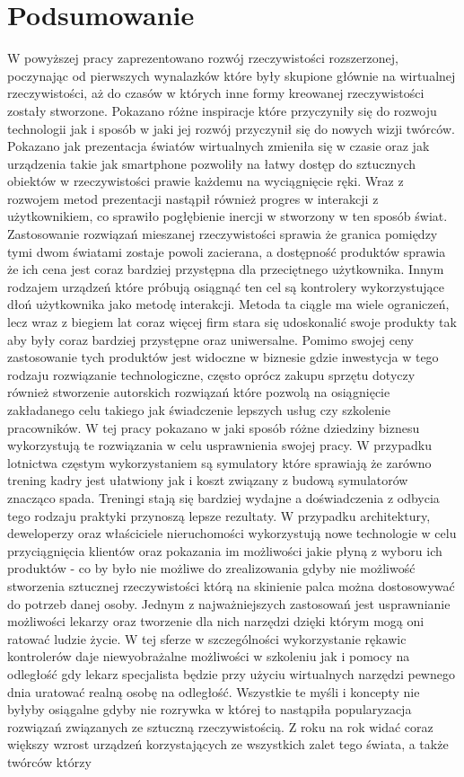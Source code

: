 \chapter*{Podsumowanie}
\label{ch:podsumowanie}
W powyższej pracy zaprezentowano rozwój rzeczywistości rozszerzonej, poczynając od pierwszych wynalazków które były skupione głównie na wirtualnej rzeczywistości, aż do czasów w których inne formy kreowanej rzeczywistości zostały stworzone. Pokazano różne inspiracje które przyczyniły się do rozwoju technologii jak i sposób w jaki jej rozwój przyczynił się do nowych wizji twórców. Pokazano jak prezentacja światów wirtualnych zmieniła się w czasie oraz jak urządzenia takie jak smartphone pozwoliły na łatwy dostęp do sztucznych obiektów w rzeczywistości prawie każdemu na wyciągnięcie ręki. Wraz z rozwojem metod prezentacji nastąpił również progres w interakcji z użytkownikiem, co sprawiło pogłębienie inercji w stworzony w ten sposób świat. Zastosowanie rozwiązań mieszanej rzeczywistości sprawia że granica pomiędzy tymi dwom światami zostaje powoli zacierana, a dostępność produktów sprawia że ich cena jest coraz bardziej przystępna dla przeciętnego użytkownika. Innym rodzajem urządzeń które próbują osiągnąć ten cel są kontrolery wykorzystujące dłoń użytkownika jako metodę interakcji. Metoda ta ciągle ma wiele ograniczeń, lecz wraz z biegiem lat coraz więcej firm stara się udoskonalić swoje produkty tak aby były coraz bardziej przystępne oraz uniwersalne. Pomimo swojej ceny zastosowanie tych produktów jest widoczne w biznesie gdzie inwestycja w tego rodzaju rozwiązanie technologiczne, często oprócz zakupu sprzętu dotyczy również stworzenie autorskich rozwiązań które pozwolą na osiągnięcie zakładanego celu takiego jak świadczenie lepszych usług czy szkolenie pracowników. W tej pracy pokazano w jaki sposób różne dziedziny biznesu wykorzystują te rozwiązania w celu usprawnienia swojej pracy. W przypadku lotnictwa częstym wykorzystaniem są symulatory które sprawiają że zarówno trening kadry jest ułatwiony jak i koszt związany z budową symulatorów znacząco spada. Treningi stają się bardziej wydajne a doświadczenia z odbycia tego rodzaju praktyki przynoszą lepsze rezultaty. W przypadku architektury, deweloperzy oraz właściciele nieruchomości wykorzystują nowe technologie w celu przyciągnięcia klientów oraz pokazania im możliwości jakie płyną z wyboru ich produktów - co by było nie możliwe do zrealizowania gdyby nie możliwość stworzenia sztucznej rzeczywistości którą na skinienie palca można dostosowywać do potrzeb danej osoby. Jednym z najważniejszych zastosowań jest usprawnianie możliwości lekarzy oraz tworzenie dla nich narzędzi dzięki którym mogą oni ratować ludzie życie. W tej sferze w szczególności wykorzystanie rękawic kontrolerów daje niewyobrażalne możliwości w szkoleniu jak i pomocy na odległość gdy lekarz specjalista będzie przy użyciu wirtualnych narzędzi pewnego dnia uratować realną osobę na odległość. Wszystkie te myśli i koncepty nie byłyby osiągalne gdyby nie rozrywka w której to nastąpiła popularyzacja rozwiązań związanych ze sztuczną rzeczywistością. Z roku na rok widać coraz większy wzrost urządzeń korzystających ze wszystkich zalet tego świata, a także twórców którzy 